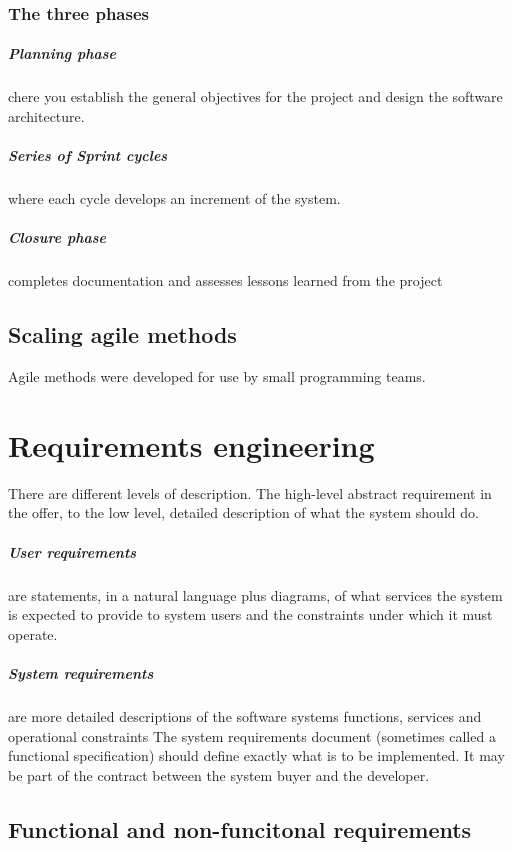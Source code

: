 \documentclass[a4paper,11pt,twocolumn]{report}
\begin{document}
    \subsection{The three phases}
    \paragraph{Planning phase} chere you establish the general objectives for
    the project and design the software architecture.
    \paragraph{Series of Sprint cycles} where each cycle develops an increment
    of the system.
    \paragraph{Closure phase} completes documentation and assesses lessons
    learned from the project
    \section{Scaling agile methods}
    Agile methods were developed for use by small programming teams. 

    \chapter{Requirements engineering}
    There are different levels of description. The high-level abstract
    requirement in the offer, to the low level, detailed description of what 
    the system should do.
    \paragraph{User requirements} are statements, in a natural language plus
    diagrams, of what services the system is expected to provide to system
    users and the constraints under which it must operate.
    \paragraph{System requirements} are more detailed descriptions of the
    software systems functions, services and operational constraints The system
    requirements document (sometimes called a functional specification) should
    define exactly what is to be implemented. It may be part of the contract
    between the system buyer and the developer.
    \section{Functional and non-funcitonal requirements}
\end{document}
